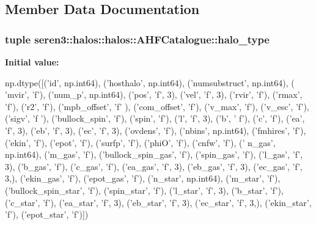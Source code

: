 \subsection{Member Data Documentation}
\hypertarget{classseren3_1_1halos_1_1halos_1_1AHFCatalogue_a298180facf70ccb5ad22bce3a4151064}{
\subsubsection[{halo\_\-type}]{\setlength{\rightskip}{0pt plus 5cm}tuple seren3::halos::halos::AHFCatalogue::halo\_\-type}}
\label{classseren3_1_1halos_1_1halos_1_1AHFCatalogue_a298180facf70ccb5ad22bce3a4151064}
{\bfseries Initial value:}
\begin{DoxyCode}
np.dtype([('id', np.int64), ('hosthalo', np.int64), ('numsubstruct', np.int64), (
      'mvir', 'f'),
                          ('num_p', np.int64), ('pos',
                                                'f', 3), ('vel', 'f', 3),
                          ('rvir', 'f'), ('rmax', 'f'), ('r2',
                                                         'f'), ('mpb_offset', 'f'
      ),
                          ('com_offset', 'f'), ('v_max',
                                                'f'), ('v_esc', 'f'), ('sigv', 'f
      '),
                          ('bullock_spin', 'f'), ('spin', 'f'), ('l',
                                                                 'f', 3), ('b', '
      f'), ('c', 'f'),
                          ('ea', 'f', 3), ('eb', 'f',
                                           3), ('ec', 'f', 3), ('ovdens', 'f'),
                          ('nbins', np.int64), ('fmhires', 'f'), ('ekin', 'f'),
                          ('epot', 'f'), ('surfp', 'f'), ('phiO',
                                                          'f'), ('cnfw', 'f'), ('
      n_gas', np.int64),
                          ('m_gas', 'f'), ('bullock_spin_gas',
                                           'f'), ('spin_gas', 'f'),
                          ('l_gas', 'f', 3), ('b_gas', 'f'), ('c_gas', 'f'),
                          ('ea_gas', 'f', 3), ('eb_gas',
                                               'f', 3), ('ec_gas', 'f', 3,),
                          ('ekin_gas', 'f'), ('epot_gas',
                                              'f'), ('n_star', np.int64),
                          ('m_star', 'f'), ('bullock_spin_star',
                                            'f'), ('spin_star', 'f'),
                          ('l_star', 'f', 3), ('b_star', 'f'), ('c_star', 'f'),
                          ('ea_star', 'f', 3), ('eb_star',
                                                'f', 3), ('ec_star', 'f', 3,),
                          ('ekin_star', 'f'), ('epot_star', 'f')])
\end{DoxyCode}
